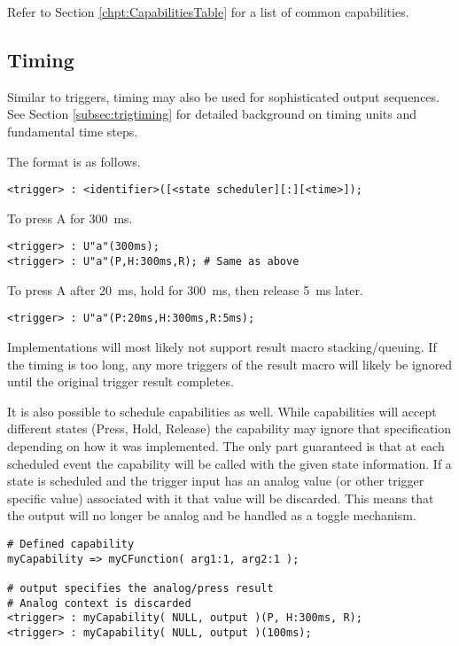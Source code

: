 \documentclass{kiibohd-template}
\begin{document}
Refer to Section \ref{chpt:CapabilitiesTable} for a list of common capabilities.


\subsection{Timing}
\label{subsec:resulttiming}

Similar to triggers, timing may also be used for sophisticated output sequences.
See Section \ref{subsec:trigtiming} for detailed background on timing units and fundamental time steps.

The format is as follows.
\begin{lstlisting}
<trigger> : <identifier>([<state scheduler][:][<time>]);
\end{lstlisting}

To press A for 300~ms.

\begin{lstlisting}
<trigger> : U"a"(300ms);
<trigger> : U"a"(P,H:300ms,R); # Same as above
\end{lstlisting}

To press A after 20~ms, hold for 300~ms, then release 5~ms later.

\begin{lstlisting}
<trigger> : U"a"(P:20ms,H:300ms,R:5ms);
\end{lstlisting}

Implementations will most likely not support result macro stacking/queuing.
If the timing is too long, any more triggers of the result macro will likely be ignored until the original trigger result completes.

It is also possible to schedule capabilities as well.
While capabilities will accept different states (Press, Hold, Release) the capability may ignore that specification depending on how it was implemented.
The only part guaranteed is that at each scheduled event the capability will be called with the given state information.
If a state is scheduled and the trigger input has an analog value (or other trigger specific value) associated with it that value will be discarded.
This means that the output will no longer be analog and be handled as a toggle mechanism.

\begin{lstlisting}
# Defined capability
myCapability => myCFunction( arg1:1, arg2:1 );

# output specifies the analog/press result
# Analog context is discarded
<trigger> : myCapability( NULL, output )(P, H:300ms, R);
<trigger> : myCapability( NULL, output )(100ms);
\end{lstlisting}
\end{document}
